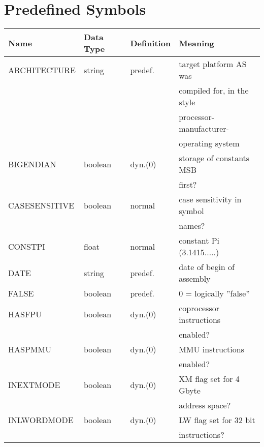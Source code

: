 \documentclass[12pt,twoside]{report}
\newcommand{\asname}{{AS}}
\begin{document}



\cleardoublepage
\chapter{Predefined Symbols}
\label{AppInternSyms}

\begin{center}\begin{longtable}{|l|l|l|l|}
\hline
Name          & Data Type & Definition & Meaning \\
\hline
\hline
\endhead
ARCHITECTURE  & string    & predef.    & target platform \asname{} was \\
              &           &            & compiled for, in the style \\
              &           &            & processor-manufacturer- \\
              &           &            & operating system \\
BIGENDIAN     & boolean   & dyn.(0)    & storage of constants MSB \\
              &           &            & first? \\
CASESENSITIVE & boolean   & normal     & case sensitivity in symbol \\
              &           &            & names? \\
CONSTPI       & float     & normal     & constant Pi (3.1415.....) \\
DATE          & string    & predef.    & date of begin of assembly \\
FALSE         & boolean   & predef.    & 0 = logically ''false'' \\
HASFPU        & boolean   & dyn.(0)    & coprocessor instructions \\
              &           &            & enabled? \\
HASPMMU       & boolean   & dyn.(0)    & MMU instructions \\
              &           &            & enabled? \\
INEXTMODE     & boolean   & dyn.(0)    & XM flag set for 4 Gbyte \\
              &           &            & address space? \\
INLWORDMODE   & boolean   & dyn.(0)    & LW flag set for 32 bit \\
              &           &            & instructions? \\

\end{longtable}
\end{center}
\end{document}
